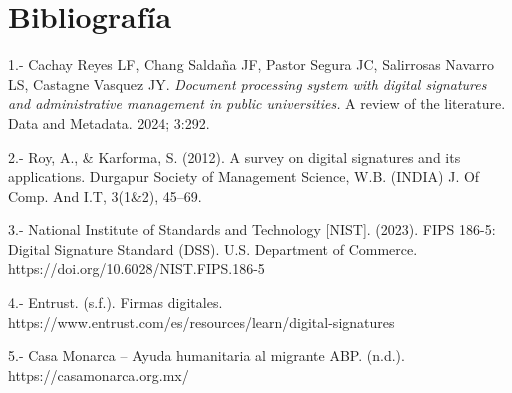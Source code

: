 \section{Bibliografía}

1.- Cachay Reyes LF, Chang Saldaña JF, Pastor Segura JC, Salirrosas Navarro LS, Castagne Vasquez JY. \textit{Document processing system with digital signatures and administrative management in public universities.} A review of the literature. Data and Metadata. 2024; 3:292. 

2.- Roy, A., & Karforma, S. (2012). A survey on digital signatures and its applications. Durgapur Society of Management Science, W.B. (INDIA) J. Of Comp. And I.T, 3(1&2), 45–69. 

3.- National Institute of Standards and Technology [NIST]. (2023). FIPS 186-5: Digital Signature Standard (DSS). U.S. Department of Commerce. https://doi.org/10.6028/NIST.FIPS.186-5 


4.- Entrust. (s.f.). Firmas digitales. https://www.entrust.com/es/resources/learn/digital-signatures


5.- Casa Monarca – Ayuda humanitaria al migrante ABP. (n.d.). https://casamonarca.org.mx/